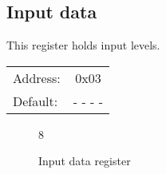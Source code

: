 \documentclass{article}
\begin{document}
	\subsection{Input data}
		
		This register holds input levels.
			
		\begin{tabular}{ l c }
			Address: & 0x03 \\
			Default: & - - - - \\
		\end{tabular}
			
		\begin{figure}[H]
			\centering
			\begin{bytefield}[
				bitwidth=0.1\linewidth]{8}
				 \\
			\end{bytefield}
			\caption{Input data register}
			\label{reg:input_value}
		\end{figure}
		
\end{document}

